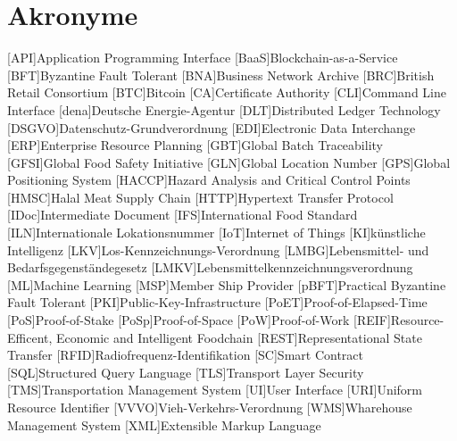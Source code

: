 \section*{Akronyme}            %
\begin{acronym}[HACCP]
  [API]{Application Programming Interface}
	[BaaS]{Blockchain-as-a-Service}
  [BFT]{Byzantine Fault Tolerant}
  [BNA]{Business Network Archive}
  [BRC]{British Retail Consortium}
	[BTC]{Bitcoin}
  [CA]{Certificate Authority}
  [CLI]{Command Line Interface}
	[dena]{Deutsche Energie-Agentur}
	[DLT]{Distributed Ledger Technology}
  [DSGVO]{Datenschutz-Grundverordnung}
  [EDI]{Electronic Data Interchange}
  [ERP]{Enterprise Resource Planning}
  [GBT]{Global Batch Traceability}
  [GFSI]{Global Food Safety Initiative}
  [GLN]{Global Location Number}
  [GPS]{Global Positioning System}
  [HACCP]{Hazard Analysis and Critical Control Points}
  [HMSC]{Halal Meat Supply Chain}
  [HTTP]{Hypertext Transfer Protocol}
  [IDoc]{Intermediate Document}
  [IFS]{International Food Standard}
  [ILN]{Internationale Lokationsnummer}
	[IoT]{Internet of Things}
  [KI]{künstliche Intelligenz}
  [LKV]{Los-Kennzeichnungs-Verordnung}
  [LMBG]{Lebensmittel- und Bedarfsgegenständegesetz}
  [LMKV]{Lebensmittelkennzeichnungsverordnung}
	[ML]{Machine Learning}
  [MSP]{Member Ship Provider}
  [pBFT]{Practical Byzantine Fault Tolerant}
  [PKI]{Public-Key-Infrastructure}
  [PoET]{Proof-of-Elapsed-Time}
  [PoS]{Proof-of-Stake}
  [PoSp]{Proof-of-Space}
	[PoW]{Proof-of-Work}
  [REIF]{Resource-Efficent, Economic and Intelligent Foodchain}
  [REST]{Representational State Transfer}
  [RFID]{Radiofrequenz-Identifikation}
	[SC]{Smart Contract}
  [SQL]{Structured Query Language}
  [TLS]{Transport Layer Security}
  [TMS]{Transportation Management System}
  [UI]{User Interface}
  [URI]{Uniform Resource Identifier}
  [VVVO]{Vieh-Verkehrs-Verordnung}
  [WMS]{Wharehouse Management System}
  [XML]{Extensible Markup Language}
\end{acronym}

\newpage

\listoffigures
{}
\listoftables
{}
\lstlistoflistings
{}
\newpage
